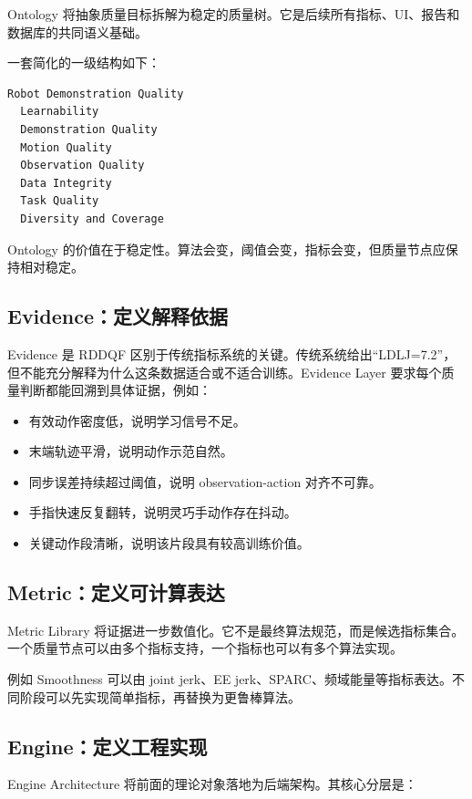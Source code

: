\documentclass[UTF8,zihao=-4]{ctexart}
\begin{document}
Ontology 将抽象质量目标拆解为稳定的质量树。它是后续所有指标、UI、报告和数据库的共同语义基础。

一套简化的一级结构如下：

\begin{verbatim}
Robot Demonstration Quality
  Learnability
  Demonstration Quality
  Motion Quality
  Observation Quality
  Data Integrity
  Task Quality
  Diversity and Coverage
\end{verbatim}

Ontology 的价值在于稳定性。算法会变，阈值会变，指标会变，但质量节点应保持相对稳定。

\subsection{Evidence：定义解释依据}

Evidence 是 RDDQF 区别于传统指标系统的关键。传统系统给出“LDLJ=7.2”，但不能充分解释为什么这条数据适合或不适合训练。Evidence Layer 要求每个质量判断都能回溯到具体证据，例如：

\begin{itemize}
\item 有效动作密度低，说明学习信号不足。
\item 末端轨迹平滑，说明动作示范自然。
\item 同步误差持续超过阈值，说明 observation-action 对齐不可靠。
\item 手指快速反复翻转，说明灵巧手动作存在抖动。
\item 关键动作段清晰，说明该片段具有较高训练价值。
\end{itemize}

\subsection{Metric：定义可计算表达}

Metric Library 将证据进一步数值化。它不是最终算法规范，而是候选指标集合。一个质量节点可以由多个指标支持，一个指标也可以有多个算法实现。

例如 Smoothness 可以由 joint jerk、EE jerk、SPARC、频域能量等指标表达。不同阶段可以先实现简单指标，再替换为更鲁棒算法。

\subsection{Engine：定义工程实现}

Engine Architecture 将前面的理论对象落地为后端架构。其核心分层是：
\end{document}
